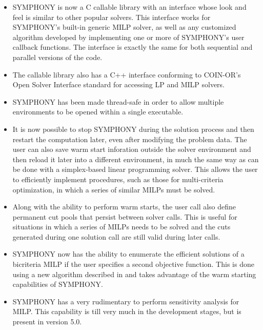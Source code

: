\begin{itemize}

\item SYMPHONY is now a C callable library with an interface whose look and
feel is similar to other popular solvers. This interface works for SYMPHONY's
built-in generic MILP solver, as well as any customized algorithm developed by
implementing one or more of SYMPHONY's user callback functions. The interface
is exactly the same for both sequential and parallel versions of the code.

\item The callable library also has a C++ interface conforming to COIN-OR's
Open Solver Interface standard for accessing LP and MILP solvers.

\item SYMPHONY has been made thread-safe in order to allow multiple
environments to be opened within a single executable.

\item It is now possible to stop SYMPHONY during the solution process and then
restart the computation later, even after modifying the problem data. The user
can also save warm start inforation outside the solver environment and then
reload it later into a different environment, in much the same way as can be
done with a simplex-based linear programming solver. This allows the user to
efficiently implement procedures, such as those for multi-criteria
optimization, in which a series of similar MILPs must be solved.

\item Along with the ability to perform warm starts, the user call also define
permanent cut pools that persist between solver calls. This is useful for
situations in which a series of MILPs needs to be solved and the cuts
generated during one solution call are still valid during later calls.

\item SYMPHONY now has the ability to enumerate the efficient solutions of a
bicriteria MILP if the user specifies a second objective function. This is
done using a new algorithm described in \cite{??} and takes advantage of the
warm starting capabilities of SYMPHONY.

\item SYMPHONY has a very rudimentary to perform sensitivity analysis for
MILP. This capability is till very much in the development stages, but is
present in version 5.0.

\end{itemize}

